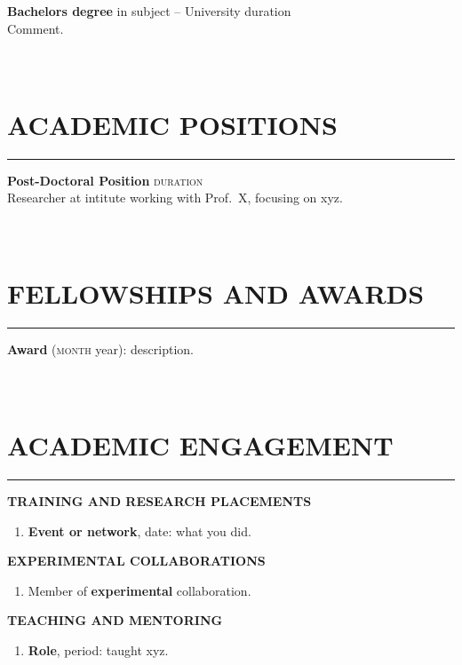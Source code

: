 \documentclass[a4paper,10pt]{article}
\newcommand{\subheader}[1]{\textcolor{linkcolour}{\footnotesize\textbf{#1}}}
\begin{document}
\textbf{Bachelors degree} in subject -- {University}  \hfill {\sc duration} 
\\
Comment.

\section{\\ACADEMIC POSITIONS}
\vspace{-3ex}\noindent\rule{\textwidth}{0.7pt}

 \textbf{Post-Doctoral Position} \hfill  \textsc{duration} 
 \\
Researcher at intitute working with Prof.~X, focusing on xyz.

\section{\\FELLOWSHIPS AND AWARDS}
\vspace{-3ex}\noindent\rule{\textwidth}{0.7pt}

\textbf{Award} (\textsc{month} year): description.
 
 
\section{\\ACADEMIC ENGAGEMENT}
\vspace{-3ex}\noindent\rule{\textwidth}{0.7pt}

\subheader{TRAINING AND RESEARCH PLACEMENTS}
\begin{enumerate}[label={\tiny$\bullet$}]

    \item \textbf{Event or network}, date: what you did.
\end{enumerate}

\subheader{EXPERIMENTAL COLLABORATIONS}
\begin{enumerate}[label={\tiny$\bullet$}]
\item Member of \textbf{experimental} collaboration.
\end{enumerate}

\subheader{TEACHING AND MENTORING} 
\begin{enumerate}[label={\tiny$\bullet$}]
\item \textbf{Role}, period: taught xyz.
\end{enumerate}
\end{document}

